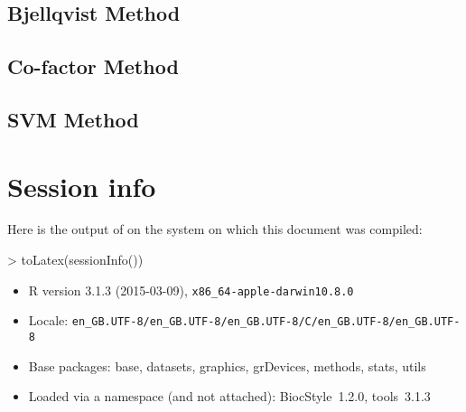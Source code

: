 \documentclass{article}
\begin{document}
\subsection{Bjellqvist Method}
\subsection{Co-factor Method}
\subsection{SVM Method}


\section{Session info}

Here is the output of  on the system on which
this document was compiled:
\begin{Schunk}
\begin{Sinput}
> toLatex(sessionInfo())
\end{Sinput}
\begin{itemize}\raggedright
  \item R version 3.1.3 (2015-03-09), \verb|x86_64-apple-darwin10.8.0|
  \item Locale: \verb|en_GB.UTF-8/en_GB.UTF-8/en_GB.UTF-8/C/en_GB.UTF-8/en_GB.UTF-8|
  \item Base packages: base, datasets, graphics, grDevices, methods, stats,
    utils
  \item Loaded via a namespace (and not attached): BiocStyle~1.2.0, tools~3.1.3
\end{itemize}\end{Schunk}


\end{document}
